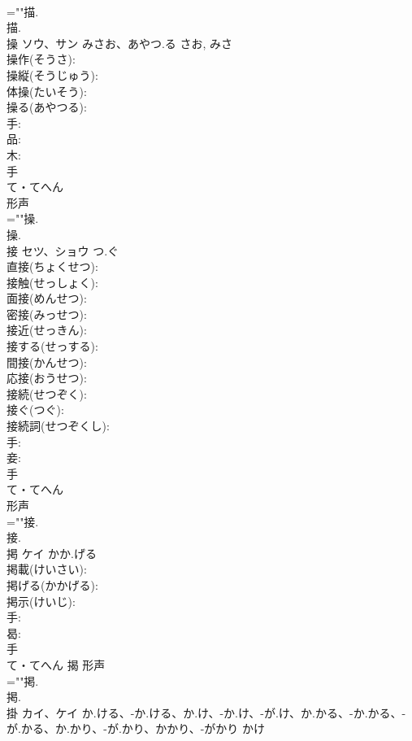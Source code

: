 \documentclass[8pt]{extreport}
\begin{document}
\begin{CJK}{UTF8}{min}
\\	=""描.
\\	描.
\\	操	ソウ、サン	みさお、あやつ.る	さお, みさ	
\\	操作(そうさ): 
\\	操縦(そうじゅう): 
\\	体操(たいそう): 
\\	操る(あやつる): 
\\	手: 
\\	品: 
\\	木: 
\\	手	
\\	て・てへん	
\\	形声 
\\	=""操.
\\	操.
\\	接	セツ、ショウ	つ.ぐ		
\\	直接(ちょくせつ): 
\\	接触(せっしょく): 
\\	面接(めんせつ): 
\\	密接(みっせつ): 
\\	接近(せっきん): 
\\	接する(せっする): 
\\	間接(かんせつ): 
\\	応接(おうせつ): 
\\	接続(せつぞく): 
\\	接ぐ(つぐ): 
\\	接続詞(せつぞくし): 
\\	手: 
\\	妾: 
\\	手	
\\	て・てへん	
\\	形声 
\\	=""接.
\\	接.
\\	掲	ケイ	かか.げる		
\\	掲載(けいさい): 
\\	掲げる(かかげる): 
\\	掲示(けいじ): 
\\	手: 
\\	曷: 
\\	手	
\\	て・てへん	揭	形声 
\\	=""掲.
\\	掲.
\\	掛	カイ、ケイ	か.ける、-か.ける、か.け、-か.け、-が.け、か.かる、-か.かる、-が.かる、か.かり、-が.かり、かかり、-がかり	かけ	

\end{CJK}
\end{document}
